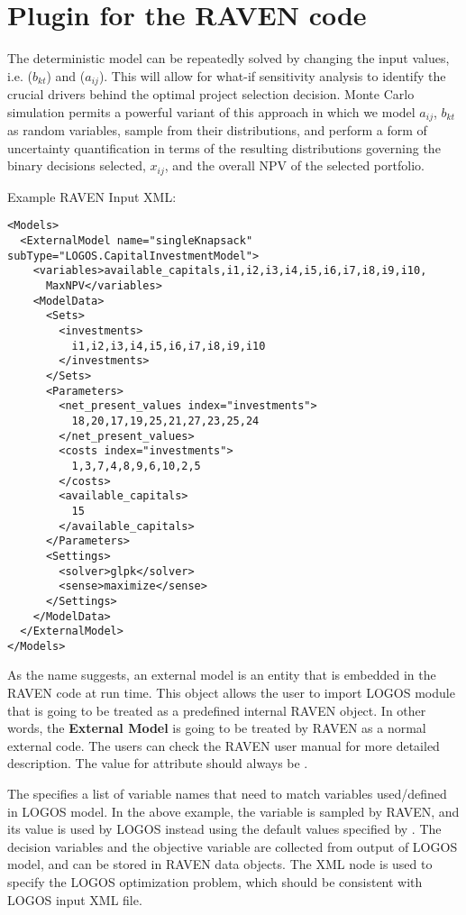 \section{Plugin for the RAVEN code}
\label{sec:RavenPlugin}

The deterministic model can be repeatedly solved by changing the input values, i.e.
 ($b_{kt}$) and  ($a_{ij}$).
This will allow for what-if sensitivity analysis to identify the
crucial drivers behind the optimal project selection decision. Monte Carlo simulation permits a
powerful variant of this approach in which we model $a_{ij}$, $b_{kt}$ as random
variables, sample from their distributions, and perform a form of uncertainty quantification
in terms of the resulting distributions governing the binary decisions selected, $x_{ij}$, and
the overall NPV of the selected portfolio.

Example RAVEN Input  XML:
\begin{lstlisting}[style=XML]
<Models>
  <ExternalModel name="singleKnapsack" subType="LOGOS.CapitalInvestmentModel">
    <variables>available_capitals,i1,i2,i3,i4,i5,i6,i7,i8,i9,i10,
      MaxNPV</variables>
    <ModelData>
      <Sets>
        <investments>
          i1,i2,i3,i4,i5,i6,i7,i8,i9,i10
        </investments>
      </Sets>
      <Parameters>
        <net_present_values index="investments">
          18,20,17,19,25,21,27,23,25,24
        </net_present_values>
        <costs index="investments">
          1,3,7,4,8,9,6,10,2,5
        </costs>
        <available_capitals>
          15
        </available_capitals>
      </Parameters>
      <Settings>
        <solver>glpk</solver>
        <sense>maximize</sense>
      </Settings>
    </ModelData>
  </ExternalModel>
</Models>
\end{lstlisting}

As the name suggests, an external model is an entity that is embedded in the RAVEN
code at run time. This object allows the user to import LOGOS module that is going
to be treated as a predefined internal RAVEN object. In other words, the
\textbf{External Model} is going to be treated by RAVEN as a normal external code.
The users can check the RAVEN user manual for more detailed description.
\nb The value for attribute  should always be .

The  specifies a list of variable names that need to match
variables used/defined in LOGOS model. In the above example, the variable
 is sampled by RAVEN, and its value is used
by LOGOS instead using the default values specified by .
The decision variables  and the
objective variable  are collected from output of LOGOS model,
and can be stored in RAVEN data objects.
The XML node  is used to specify the LOGOS optimization problem, which
should be consistent with LOGOS input XML file.

